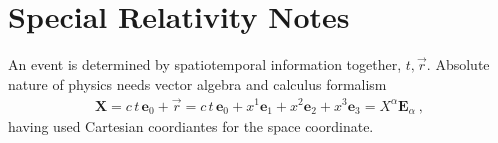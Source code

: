 \documentclass[letterpaper,10pt,english]{jupyterBook}
\begin{document}
\sphinxstepscope


\chapter{Special Relativity \sphinxhyphen{} Notes}
\label{\detokenize{ch/relativity-special/notes:special-relativity-notes}}\label{\detokenize{ch/relativity-special/notes:relativity-special-notes}}\label{\detokenize{ch/relativity-special/notes::doc}}
\sphinxAtStartPar
An event is determined by spatio\sphinxhyphen{}temporal information together, \(t, \vec{r}\). Absolute nature of physics needs vector algebra and calculus formalism
\begin{equation*}
\begin{split}\mathbf{X} = c  \,t  \,\mathbf{e}_0 + \vec{r} =  c \, t \, \mathbf{e}_0 + x^1 \mathbf{e}_1 + x^2 \mathbf{e}_2 + x^3 \mathbf{e}_3 = X^{\alpha} \mathbf{E}_{\alpha} \ ,\end{split}
\end{equation*}
\sphinxAtStartPar
having used Cartesian coordiantes for the space coordinate.
\end{document}
